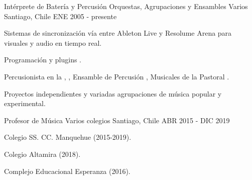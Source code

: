 \begin{cventries}
  \cventry
    {Intérprete de Batería y Percusión}
    {Orquestas, Agrupaciones y Ensambles Varios}
    {Santiago, Chile}
    {ENE 2005 - presente}
    {
    	\begin{cvitems} %
    	  \item {Sistemas de sincronización  vía  entre Ableton Live y Resolume Arena para visuales y audio  en tiempo real.}
    	  \item {Programación  y plugins .}
        \item {Percusionista en la , , Ensamble de Percusión , Musicales de la Pastoral .}
        \item {Proyectos independientes y variadas agrupaciones de música popular y experimental.}
      \end{cvitems}
		}

  \cventry
    {Profesor de Música} %
    {Varios colegios} %
    {Santiago, Chile} %
    {ABR 2015 - DIC 2019} %
    {
      \begin{cvitems} %
        \item {Colegio SS. CC. Manquehue (2015-2019).}
        \item {Colegio Altamira (2018).}
        \item {Complejo Educacional Esperanza (2016).}
      \end{cvitems}
    }

\end{cventries}

